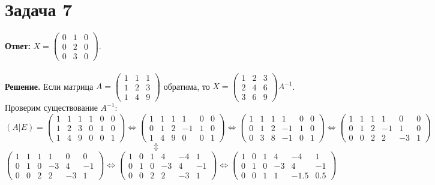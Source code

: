 \documentclass{article}
\begin{document}
\section*{Задача 7}
{\bf Ответ:} $X=\left(\begin{array}{rrr}0 & 1 & 0\\0 & 2 & 0\\0 & 3 & 0\end{array}\right)$.
\\
\\
{\bf Решение.} Если матрица $A=\left(\begin{array}{rrr}1 & 1 & 1\\1 & 2 & 3\\1 & 4 & 9\end{array}\right)$ обратима, то $X=\left(\begin{array}{rrr}1 & 2 & 3\\2 & 4 & 6\\3 & 6 & 9\end{array}\right)A^{-1}$. Проверим существование $A^{-1}$:
\\
$$(A|E)=\left(\begin{array}{ccc|ccc}1 & 1 & 1 & 1 & 0 & 0\\1 & 2 & 3 & 0 & 1 & 0\\1 & 4 & 9 & 0 & 0 & 1\end{array}\right)\Leftrightarrow\left(\begin{array}{ccc|ccc}1 & 1 & 1 & 1 & 0 & 0\\0 & 1 & 2 & -1 & 1 & 0\\1 & 4 & 9 & 0 & 0 & 1\end{array}\right)\Leftrightarrow\left(\begin{array}{ccc|ccc}1 & 1 & 1 & 1 & 0 & 0\\0 & 1 & 2 & -1 & 1 & 0\\0 & 3 & 8 & -1 & 0 & 1\end{array}\right)\Leftrightarrow\left(\begin{array}{ccc|ccc}1 & 1 & 1 & 1 & 0 & 0\\0 & 1 & 2 & -1 & 1 & 0\\0 & 0 & 2 & 2 & -3 & 1\end{array}\right)$$
$$\Updownarrow$$
$$\left(\begin{array}{ccc|ccc}1 & 1 & 1 & 1 & 0 & 0\\0 & 1 & 0 & -3 & 4 & -1\\0 & 0 & 2 & 2 & -3 & 1\end{array}\right)\Leftrightarrow\left(\begin{array}{ccc|ccc}1 & 0 & 1 & 4 & -4 & 1\\0 & 1 & 0 & -3 & 4 & -1\\0 & 0 & 2 & 2 & -3 & 1\end{array}\right)\Leftrightarrow\left(\begin{array}{ccc|ccc}1 & 0 & 1 & 4 & -4 & 1\\0 & 1 & 0 & -3 & 4 & -1\\0 & 0 & 1 & 1 & -1.5 & 0.5\end{array}\right)$$
\end{document}
